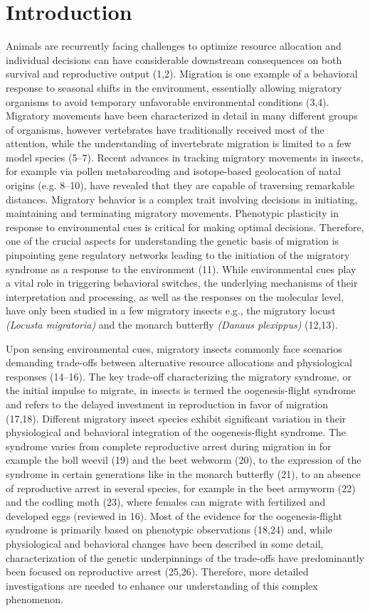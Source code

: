 \documentclass[lineno]{wiley-article}
\begin{document}
\section{Introduction}
Animals are recurrently facing challenges to optimize resource allocation and individual decisions can have considerable downstream consequences on both survival and reproductive output (1,2). Migration is one example of a behavioral response to seasonal shifts in the environment, essentially allowing migratory organisms to avoid temporary unfavorable environmental conditions (3,4). Migratory movements have been characterized in detail in many different groups of organisms, however vertebrates have traditionally received most of the attention, while the understanding of invertebrate migration is limited to a few model species (5–7). Recent advances in tracking migratory movements in insects, for example via pollen metabarcoding and isotope-based geolocation of natal origins (e.g. 8–10), have revealed that they are capable of traversing remarkable distances. Migratory behavior is a complex trait involving decisions in initiating, maintaining and terminating migratory movements. Phenotypic plasticity in response to environmental cues is critical for making optimal decisions. Therefore, one of the crucial aspects for understanding the genetic basis of migration is pinpointing gene regulatory networks leading to the initiation of the migratory syndrome as a response to the environment (11). While environmental cues play a vital role in triggering behavioral switches, the underlying mechanisms of their interpretation and processing, as well as the responses on the molecular level, have only been studied in a few migratory insects e.g., the migratory locust \textit{(Locusta migratoria)} and the monarch butterfly \textit{(Danaus plexippus)} (12,13).

Upon sensing environmental cues, migratory insects commonly face scenarios demanding trade-offs between alternative resource allocations and physiological responses (14–16). The key trade-off characterizing the migratory syndrome, or the initial impulse to migrate, in insects is termed the oogenesis-flight syndrome and refers to the delayed investment in reproduction in favor of migration (17,18). Different migratory insect species exhibit significant variation in their physiological and behavioral integration of the oogenesis-flight syndrome. The syndrome varies from complete reproductive arrest during migration in for example the boll weevil (19) and the beet webworm (20), to the expression of the syndrome in certain generations like in the monarch butterfly (21), to an absence of reproductive arrest in several species, for example in the beet armyworm (22) and the codling moth (23), where females can migrate with fertilized and developed eggs (reviewed in 16). Most of the evidence for the oogenesis-flight syndrome is primarily based on phenotypic observations (18,24) and, while physiological and behavioral changes have been described in some detail, characterization of the genetic underpinnings of the trade-offs have predominantly been focused on reproductive arrest (25,26). Therefore, more detailed investigations are needed to enhance our understanding of this complex phenomenon.
\end{document}
